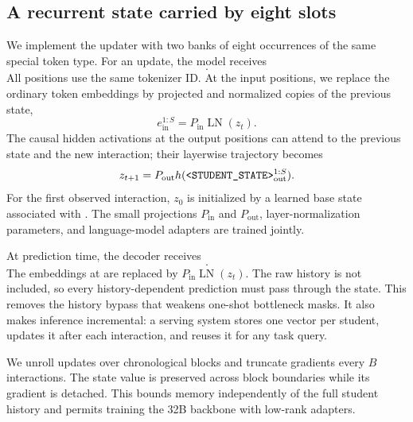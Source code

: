 \subsection{A recurrent state carried by eight slots}

We implement the updater with two banks of eight occurrences of the same
special token type.  For
an update, the model receives
\begin{equation}
 [\studentstate{}_{\mathrm{in}}^{1:S};\;\operatorname{serialize}(x_t);\;
  \studentstate{}_{\mathrm{out}}^{1:S}].
\end{equation}
All positions use the same tokenizer ID.  At the input positions, we replace
the ordinary token embeddings by projected and normalized copies of the
previous state,
\begin{equation}
    e_{\mathrm{in}}^{1:S}=P_{\mathrm{in}}\operatorname{LN}(z_t).
\end{equation}
The causal hidden activations at the output positions can attend to the
previous state and the new interaction; their layerwise trajectory becomes
\begin{equation}
    z_{t+1}=P_{\mathrm{out}}h(\texttt{<STUDENT\_STATE>}{}_{\mathrm{out}}^{1:S}).
\end{equation}
For the first observed interaction, $z_0$ is initialized by a learned base
state associated with \studentstate{}.  The small projections $P_{\mathrm{in}}$ and
$P_{\mathrm{out}}$, layer-normalization parameters, and language-model adapters
are trained jointly.

At prediction time, the decoder receives
\begin{equation}
 [\operatorname{instruction}(\tau);\;\studentstate{}^{1:S};\;
  \operatorname{serialize}(\tilde q_t);\;o_t].
\end{equation}
The embeddings at \studentstate{} are replaced by
$P_{\mathrm{in}}\operatorname{LN}(z_t)$.  The raw history is not included, so
every history-dependent prediction must pass through the state.
This removes the history bypass that weakens one-shot bottleneck masks.  It also
makes inference incremental: a serving system stores one vector per student,
updates it after each interaction, and reuses it for any task query.

We unroll updates over chronological blocks and truncate gradients every $B$
interactions.  The state value is preserved across block boundaries while its
gradient is detached.  This bounds memory independently of the full student
history and permits training the 32B backbone with low-rank adapters.

